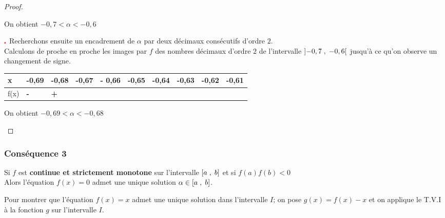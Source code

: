 \begin{proof}
\begin{enumerate}
\vspace{0.5cm}   On obtient $-0,7<\alpha< - 0,6  $


$ \color{red}\centerdot $ Recherchons ensuite  un encadrement de $ \alpha $ par deux décimaux consécutifs d'ordre $ 2. $\\
Calculons de proche en proche les images par $ f $  des nombres décimaux d'ordre $ 2 $ de l'intervalle $ \left]-0,7 \;,\; -0,6\right[ $ jusqu'à ce qu'on observe un changement de signe.

\begin{center}
\begin{tabularx}{\textwidth}{|X|X|X|X|X|X|X|X|X|X|}
\hline 
x &-0,69  &-0,68 & -0,67 &- 0,66 & -0,65 & -0,64 &-0,63 &-0,62& -0,61  \\
\hline
f(x) &\textbf{\color{red} -} & \textbf{\color{red} +}  &  &   & \color{green} &  &  &  &  \\
\hline
\end{tabularx}

\vspace{0.5cm}   On obtient $-0,69<\alpha< - 0,68  $

\end{center}
\end{enumerate}
  \end{proof}
  \subsubsection*{Conséquence 3}
  
 Si $ f $ est \textbf{\color{magenta}continue et strictement monotone} sur  l'intervalle $ \left[a\;,\; b\right] $ et si \colorbox{green!20!}{$ f(a)f(b) < 0 $ }\\
Alors l'équation $ f(x)=0 $ admet une  unique  solution $ \alpha \in \left[a\;,\; b\right] $.

\begin{remark}
Pour montrer que l'équation $ f(x)=x $ admet une  unique  solution dans l'intervalle $I$; on pose $ g(x)=f(x)-x $ et on applique le T.V.I à la fonction $ g $ sur l'intervalle $I$.
\end{remark}

